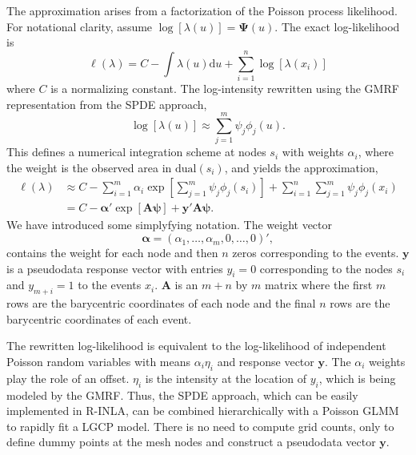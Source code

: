 \documentclass[]{interact}
\begin{document}
The approximation arises from a factorization of the Poisson process
likelihood. For notational clarity, assume \(\log[\lambda(u)]
= \boldsymbol{\Psi}(u)\). The exact log-likelihood is
\begin{displaymath}
\ell(\lambda) = C - \int \lambda(u) \mathrm{d}u
+ \sum_{i = 1}^{n} \log\left[\lambda(x_{i})\right]
\end{displaymath}
where \(C\) is a normalizing constant. The log-intensity rewritten using the
GMRF representation from the SPDE approach,
\begin{displaymath}
\log\left[\lambda(u)\right]
\approx \sum_{j = 1}^{m} \psi_{j} \phi_{j}(u).
\end{displaymath}
This defines a numerical integration scheme at nodes \(s_{i}\)
with weights \(\alpha_{i}\), where the weight is the observed area in
\(\mathrm{dual}(s_{i})\), and yields the approximation,
\begin{align*}
\ell(\lambda) &\approx C - \sum_{i = 1}^{m} \alpha_{i}
\exp\left[\sum_{j = 1}^{m} \psi_{j}\phi_{j}(s_{i})\right]
+ \sum_{i = 1}^{n} \sum_{j = 1}^{m} \psi_{j}\phi_{j}(x_{i}) \\
& = C - \boldsymbol{\alpha}'
\exp\left[\mathbf{A} \boldsymbol{\psi}\right]
+ \mathbf{y}' \mathbf{A} \boldsymbol{\psi}.
\end{align*}
We have introduced some simplyfying notation. The weight vector
\begin{displaymath}
\boldsymbol{\alpha} = (\alpha_{1}, \dots, \alpha_{m}, 0, \dots, 0)',
\end{displaymath}
contains the weight for each node and then \(n\) zeros corresponding to the
events. \(\mathbf{y}\) is a pseudodata response vector with entries
\(y_{i} = 0\) corresponding to the nodes \(s_{i}\) and \(y_{m+i} = 1\) to the
events \(x_{i}\). \(\mathbf{A}\) is an \(m + n\) by \(m\) matrix where the
first \(m\) rows are the barycentric coordinates of each node and the final
\(n\) rows are the barycentric coordinates of each event.

The rewritten log-likelihood is equivalent to the log-likelihood of
independent Poisson random variables with means \(\alpha_{i} \eta_{i}\) and
response vector \(\mathbf{y}\). The \(\alpha_{i}\) weights play the role of
an offset. \(\eta_{i}\) is the intensity at the location of \(y_{i}\), which
is being modeled by the GMRF. Thus, the SPDE approach, which can be easily
implemented in R-INLA, can be combined hierarchically with a Poisson GLMM to
rapidly fit a LGCP model. There is no need to compute grid counts, only to
define dummy points at the mesh nodes and construct a pseudodata vector
\(\mathbf{y}\).
\end{document}
